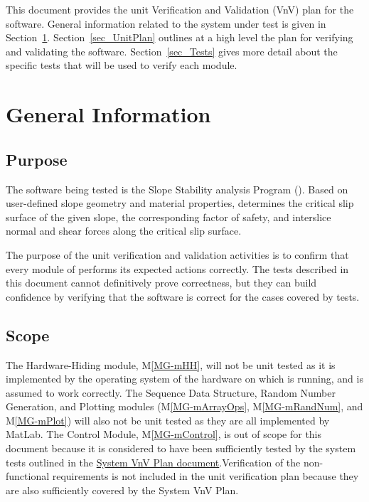 \documentclass[12pt, titlepage]{article}
\newcommand{\mref}[1]{M\ref{#1}}
\begin{document}
\newpage


This document provides the unit Verification and Validation (VnV) plan for the 
software. General information related to the system under test is given in 
Section~\ref{sec_Info}. Section~\ref{sec_UnitPlan} outlines at a high level the 
plan for verifying and validating the software. Section~\ref{sec_Tests} gives 
more detail about the specific tests that will be used to verify each module.

\section{General Information} \label{sec_Info}

\subsection{Purpose}

\noindent The software being tested is the Slope Stability analysis Program 
(\progname{}). Based on user-defined slope geometry and material properties, 
\progname{} determines the critical slip surface of the given slope, the 
corresponding factor of safety, and interslice normal and shear forces along 
the critical slip surface.

\noindent The purpose of the unit verification and validation activities is to 
confirm that every module of \progname{} performs its expected actions 
correctly. The tests described in this document cannot definitively prove 
correctness, but they can build confidence by verifying that the software is 
correct for the cases covered by tests.

\subsection{Scope} \label{Scope}

The Hardware-Hiding module, \noindent \mref{MG-mHH}, will not be unit tested as 
it is implemented by the operating system of the hardware on which \progname{} 
is running, and is assumed to work correctly. The Sequence Data Structure, 
Random Number Generation, and Plotting modules (\mref{MG-mArrayOps}, 
\mref{MG-mRandNum}, and \mref{MG-mPlot}) will also not be unit tested as they 
are all implemented by MatLab. The Control Module, \mref{MG-mControl}, is out 
of scope for this document because it is considered to have been sufficiently 
tested by the system tests outlined in the 
\href{https://github.com/smiths/caseStudies/blob/master/CaseStudies/ssp/docs/VnVPlan/SystVnVPlan/SystVnVPlan.pdf}
{System VnV Plan document}.Verification of the non-functional requirements is 
not included in the unit verification plan because they are also sufficiently 
covered by the System VnV Plan.
\end{document}
